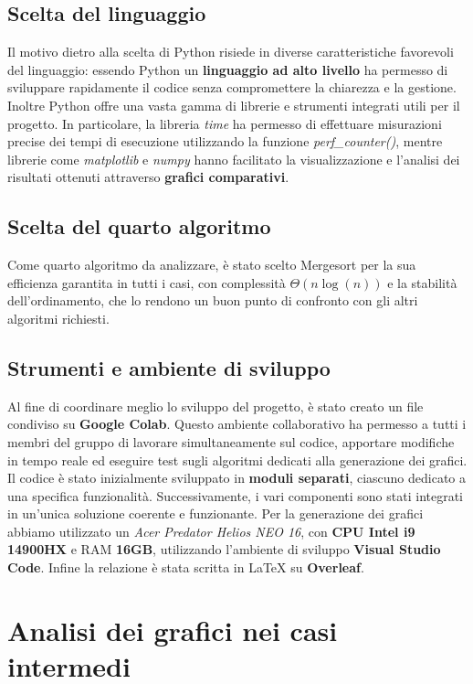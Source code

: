 \documentclass{article}
\begin{document}
\subsection*{Scelta del linguaggio}
Il motivo dietro alla scelta di Python risiede in diverse caratteristiche favorevoli del linguaggio: essendo Python un \textbf{linguaggio ad alto livello} ha permesso di sviluppare rapidamente il codice senza compromettere la chiarezza e la gestione.
Inoltre Python offre una vasta gamma di librerie e strumenti integrati utili per il progetto. In particolare, la libreria \emph{time} ha permesso di effettuare misurazioni precise dei tempi di esecuzione utilizzando la funzione \emph{perf\_counter()}, mentre librerie come \emph{matplotlib} e \emph{numpy} hanno facilitato la visualizzazione e l'analisi dei risultati ottenuti attraverso \textbf{grafici comparativi}.

\subsection*{Scelta del quarto algoritmo}
Come quarto algoritmo da analizzare, è stato scelto Mergesort per la sua efficienza garantita in tutti i casi, con complessità $\Theta(n \log (n))$ e la stabilità dell’ordinamento, che lo rendono un buon punto di confronto con gli altri algoritmi richiesti.

\subsection*{Strumenti e ambiente di sviluppo}
Al fine di coordinare meglio lo sviluppo del progetto, è stato creato un file condiviso su \textbf{Google Colab}. Questo ambiente collaborativo ha permesso a tutti i membri del gruppo di lavorare simultaneamente sul codice, apportare modifiche in tempo reale ed eseguire test sugli algoritmi dedicati alla generazione dei grafici.
Il codice è stato inizialmente sviluppato in \textbf{moduli separati}, ciascuno dedicato a una specifica funzionalità. Successivamente, i vari componenti sono stati integrati in un'unica soluzione coerente e funzionante.
Per la generazione dei grafici abbiamo utilizzato un \emph{Acer Predator Helios NEO 16}, con \textbf{CPU Intel i9 14900HX} e RAM \textbf{16GB}, utilizzando l'ambiente di sviluppo \textbf{Visual Studio Code}. 
Infine la relazione è stata scritta in LaTeX su \textbf{Overleaf}.

\section{Analisi dei grafici nei casi intermedi}
\label{sec:grafici}
\end{document}
